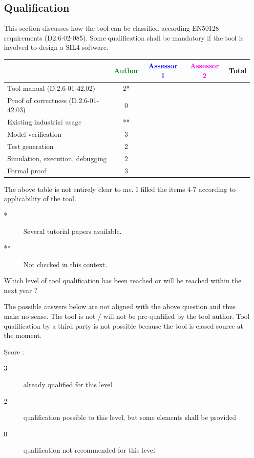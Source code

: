 \subsection{Qualification}

This section discusses how the tool can be classified according EN50128 requirements (D2.6-02-085). Some qualification shall be mandatory  if the tool is involved to design a SIL4 software.


\begin{tabular}{|l | c | c | c | c|}
\hline
& \textcolor{green}{Author} & \textcolor{blue}{Assessor 1} & \textcolor{magenta}{Assessor 2} & Total \\
\hline 
Tool manual (D.2.6-01-42.02) &2* & & &  \\
\hline
Proof of correctness (D.2.6-01-42.03)   &0 & & & \\
\hline
Existing industrial  usage  &** & & & \\
\hline
Model verification &3 & & & \\
\hline
Test generation &2 & & & \\
\hline
Simulation, execution, debugging &2 & & & \\
\hline
Formal proof &3 & & & \\
\hline
\end{tabular}

\begin{author_comment}
The above table is not entirely clear to me. I filled the items 4-7 according to applicability of the tool.
\begin{description}
\item[*] Several tutorial papers available.
\item[**] Not checked in this context.
\end{description}
\end{author_comment}


Which level of tool qualification has been reached or will be reached within the next year ?

\begin{author_comment}
The possible answers below are not aligned with the above question and thus make no sense. The tool is not / will not be pre-qualified by the tool author. Tool qualification by a third party is not possible because the tool is closed source at the moment.
\end{author_comment}

Score :
\begin{description}
\item[3] already qualified for this level
\item[2] qualification possible to this level, but some elements shall be provided
\item[0] qualification not recommended for this level
\end{description}


